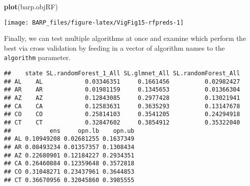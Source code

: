 \documentclass[]{article}
\newenvironment{Shaded}{\begin{snugshade}}{\end{snugshade}}
\newcommand{\KeywordTok}[1]{\textcolor[rgb]{0.13,0.29,0.53}{\textbf{#1}}}
\newcommand{\DataTypeTok}[1]{\textcolor[rgb]{0.13,0.29,0.53}{#1}}
\newcommand{\DecValTok}[1]{\textcolor[rgb]{0.00,0.00,0.81}{#1}}
\newcommand{\StringTok}[1]{\textcolor[rgb]{0.31,0.60,0.02}{#1}}
\newcommand{\OperatorTok}[1]{\textcolor[rgb]{0.81,0.36,0.00}{\textbf{#1}}}
\newcommand{\NormalTok}[1]{#1}
\begin{document}
\begin{Shaded}
\begin{Highlighting}[]
\KeywordTok{plot}\NormalTok{(barp.objRF)}
\end{Highlighting}
\end{Shaded}

\begin{center}\texttt{[image: BARP\_files/figure-latex/VigFig15-rfpreds-1]} \end{center}

Finally, we can test multiple algorithms at once and examine which
perform the best via cross validation by feeding in a vector of
algorithm names to the \texttt{algorithm} parameter.

\begin{Shaded}
\end{Shaded}

\begin{Shaded}
\end{Shaded}

\begin{verbatim}
##    state SL.randomForest_1_All SL.glmnet_All SL.randomForest_All
## AL    AL            0.03346351     0.1661456          0.02982427
## AR    AR            0.01981159     0.1345653          0.01366304
## AZ    AZ            0.12843085     0.2977428          0.13021941
## CA    CA            0.12583631     0.3635293          0.13147678
## CO    CO            0.25814103     0.3541205          0.24294918
## CT    CT            0.32847602     0.3854912          0.35322040
##           ens     opn.lb    opn.ub
## AL 0.10949208 0.02681255 0.1637349
## AR 0.08493234 0.01357357 0.1308434
## AZ 0.22680901 0.12184227 0.2934351
## CA 0.26460884 0.12359648 0.3572818
## CO 0.31048271 0.23437961 0.3644853
## CT 0.36670956 0.32045860 0.3985555
\end{verbatim}
\end{document}

